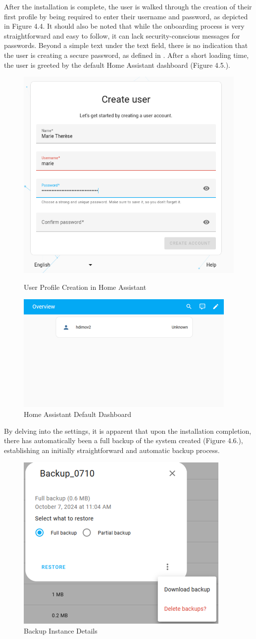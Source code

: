 After the installation is complete, the user is walked through the creation of their first profile by being required to enter their username and password, as depicted in Figure 4.4. It should also be noted that while the onboarding process is very straightforward and easy to follow, it can lack security-conscious messages for passwords. Beyond a simple text under the text field, there is no indication that the user is creating a secure password, as defined in \cite{bsi_secure_pass}.
After a short loading time, the user is greeted by the default Home Assistant dashboard (Figure 4.5.).

\begin{figure}[H]
	\centering
	\includegraphics[width=0.5 \linewidth]{Images/K4/Picture4.png}
	\caption{User Profile Creation in Home Assistant}
	\label{fig:Rpi_user}
    \cite{rpi_ha_onboarding}
\end{figure}

\begin{figure}[H]
	\centering
	\includegraphics[width=0.5 \linewidth]{Images/K4/Picture5.png}
	\caption{Home Assistant Default Dashboard}
	\label{fig:Rpi_dashboard}
\end{figure}

By delving into the settings, it is apparent that upon the installation completion, there has automatically been a full backup of the system created (Figure 4.6.), establishing an initially straightforward and automatic backup process.

\begin{figure}[H]
	\centering
	\includegraphics[width=0.4 \linewidth]{Images/K4/Picture3.png}
	\caption{Backup Instance Details}
	\label{fig:Rpi_backup}
\end{figure}


